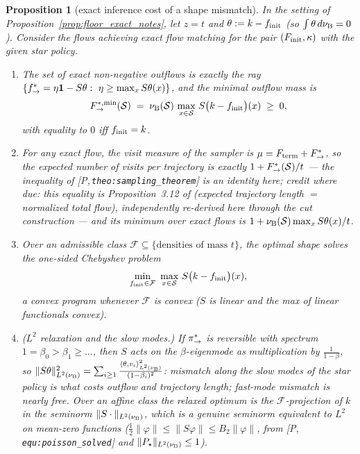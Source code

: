 \documentclass[11pt]{article}
\newtheorem{proposition}[theorem]{Proposition}
\theoremstyle{definition}
\theoremstyle{remark}
\newcommand{\paperref}[1]{[P,\,\texttt{#1}]}   %
\begin{document}
\begin{proposition}[exact inference cost of a shape mismatch]\label{prop:shape_cost_notes}
In the setting of Proposition~\ref{prop:floor_exact_notes}, let $z=t$ and
$\theta:=k-f_{\mathrm{init}}$ (so $\int\theta\,d\nu_{\mathrm{B}}=0$). Consider the flows achieving
\emph{exact} flow matching for the pair $(F_{\mathrm{init}},\kappa)$ with the given star policy.
\begin{enumerate}
    \item The set of exact non-negative outflows is exactly the ray
    $\{\foutstar=\eta\mathbf 1-S\theta:\ \eta\geq\max_xS\theta(x)\}$, and the minimal
    outflow mass is
    \begin{equation}\label{equ:min_outflow_notes}
        F^{*,\min}_{\rightarrow}(\mathcal S)\;=\;\nu_{\mathrm{B}}(\mathcal S)\,
        \max_{x\in\mathcal S}\,S\bigl(k-f_{\mathrm{init}}\bigr)(x)\;\geq\;0,
    \end{equation}
    with equality to $0$ iff $f_{\mathrm{init}}=k$.
    \item For any exact flow, the visit measure of the sampler is
    $\mu=F_{\mathrm{term}}+F^*_{\rightarrow}$, so the expected number of visits per trajectory is
    \emph{exactly} $1+F^*_{\rightarrow}(\mathcal S)/t$ --- the inequality of
    \paperref{theo:sampling\_theorem} is an identity here; credit where due: this
    equality is Proposition~3.12 of \citet{morozov2025revisiting} (expected trajectory
    length $=$ normalized total flow), independently re-derived here through the cut
    construction --- and its minimum over exact flows is
    $1+\nu_{\mathrm{B}}(\mathcal S)\max_xS\theta(x)/t$.
    \item Over an admissible class $\mathcal F\subseteq\{\text{densities of mass }t\}$,
    the optimal shape solves the \emph{one-sided Chebyshev problem}
    \begin{equation}\label{equ:chebyshev_notes}
        \min_{\finit\in\mathcal F}\ \max_{x\in\Statespace}\,S\bigl(k-\finit\bigr)(x),
    \end{equation}
    a convex program whenever $\mathcal F$ is convex ($S$ is linear and the max of linear
    functionals convex).
    \item ($L^2$ relaxation and the slow modes.) If $\pi_{\rightarrow}^*$ is reversible
    with spectrum $1=\beta_0>\beta_1\geq\dots$, then $S$ acts on the $\beta$-eigenmode as
    multiplication by $\frac1{1-\beta}$, so
    $\|S\theta\|^2_{L^2(\nu_{\mathrm{B}})}=\sum_{i\geq1}\frac{\langle\theta,v_i\rangle^2_{L^2(\nu_{\mathrm{B}})}}{(1-\beta_i)^2}$:
    mismatch along the \emph{slow} modes of the star policy is what costs outflow and
    trajectory length; fast-mode mismatch is nearly free. Over an affine class the
    relaxed optimum is the $\mathcal F$-projection of $k$ in the seminorm $\|S\cdot\|_{L^2(\nu_{\mathrm{B}})}$,
    which is a genuine seminorm equivalent to $L^2$ on mean-zero functions
    ($\tfrac12\|\varphi\|\leq\|S\varphi\|\leq B_2\|\varphi\|$, from
    \paperref{equ:poisson\_solved} and $\|P_\star\|_{L^2(\nu_{\mathrm{B}})}\le1$).
\end{enumerate}
\end{proposition}
\end{document}
